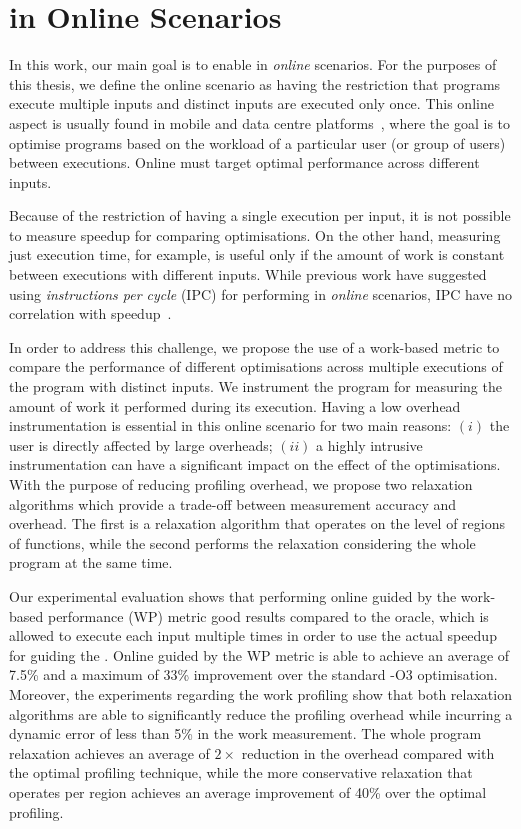 \section{{\IterComp} in Online Scenarios}

In this work, our main goal is to enable {\itercomp} in \textit{online} scenarios.
For the purposes of this thesis, we define the online scenario as having the restriction that programs execute multiple inputs and distinct inputs are executed only once.
This online aspect is usually found in mobile and data centre platforms~\citep{chen12b,fang15,mpeis16}, where the goal is to optimise programs based on the workload of a particular user (or group of users) between executions.
Online {\itercomp} must target optimal performance across different inputs.

Because of the restriction of having a single execution per input, it is not possible to measure speedup for comparing optimisations.
On the other hand, measuring just execution time, for example, is useful only if the amount of work is constant between executions with different inputs.
While previous work have suggested using \textit{instructions per cycle} (IPC) for performing {\itercomp} in \textit{online} scenarios, IPC have no correlation with speedup~\citep{fursin07}.

In order to address this challenge, we propose the use of a work-based metric to compare the performance of different optimisations across multiple executions of the program with distinct inputs.
We instrument the program for measuring the amount of work it performed during its execution.
Having a low overhead instrumentation is essential in this online scenario for two main reasons:
$(i)$ the user is directly affected by large overheads;
$(ii)$ a highly intrusive instrumentation can have a significant impact on the effect of the optimisations.
With the purpose of reducing profiling overhead, we propose two relaxation algorithms which provide a trade-off between measurement accuracy and overhead.
The first is a relaxation algorithm that operates on the level of regions of functions, while the second performs the relaxation considering the whole program at the same time.

Our experimental evaluation shows that performing online {\itercomp} guided by the work-based performance (WP) metric good results compared to the oracle, which is allowed to execute each input multiple times in order to use the actual speedup for guiding the {\itercomp}.
Online {\itercomp} guided by the WP metric is able to achieve an average of 7.5\% and a maximum of 33\% improvement over the standard {\flagstype -O3} optimisation.
Moreover, the experiments regarding the work profiling show that both relaxation algorithms are able to significantly reduce the profiling overhead while incurring a dynamic error of less than 5\% in the work measurement.
The whole program relaxation achieves an average of $2\times$ reduction in the overhead compared with the optimal profiling technique, while the more conservative relaxation that operates per region achieves an average improvement of 40\% over the optimal profiling.

